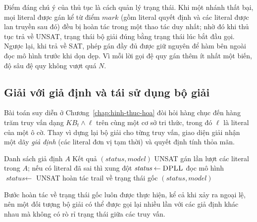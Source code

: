 Điểm đáng chú ý của thủ tục là cách quản lý trạng thái. Khi một nhánh thất bại, mọi literal được gán kể từ điểm $\textit{mark}$ (gồm literal quyết định và các literal được lan truyền sau đó) đều bị hoàn tác trong một thao tác duy nhất; nhờ đó khi thủ tục trả về UNSAT, trạng thái bộ giải đúng bằng trạng thái lúc bắt đầu gọi. Ngược lại, khi trả về SAT, phép gán đầy đủ được giữ nguyên để hàm bên ngoài đọc mô hình trước khi dọn dẹp. Vì mỗi lời gọi đệ quy gán thêm ít nhất một biến, độ sâu đệ quy không vượt quá $N$.

\subsection{Giải với giả định và tái sử dụng bộ giải}
\label{subsec:dpll-gia-dinh}

Bài toán suy diễn ở Chương~\ref{chap:hinh-thuc-hoa} đòi hỏi hàng chục đến hàng trăm truy vấn dạng $KB_t \land \ell$ trên cùng một cơ sở tri thức, trong đó $\ell$ là literal của một ô cờ. Thay vì dựng lại bộ giải cho từng truy vấn, giao diện giải nhận một dãy \emph{giả định} (các literal đơn vị tạm thời) và quyết định tính thỏa mãn.

\begin{algorithm}[H]
\caption{Giải với giả định \textsc{Solve}}
\label{alg:solve}
\begin{algorithmic}[1]
\REQUIRE Danh sách giả định $A$
\ENSURE Kết quả $(\textit{status}, \textit{model})$
    \RETURN UNSAT
\ENDIF
\STATE gán lần lượt các literal trong $A$; nếu có literal đã sai thì xung đột
    \STATE $\textit{status} \leftarrow \textsc{DPLL}$
        \STATE đọc mô hình
    \ENDIF
\ELSE
    \STATE $\textit{status} \leftarrow$ UNSAT
\ENDIF
\STATE hoàn tác trail về trạng thái gốc 
\RETURN $(\textit{status}, \textit{model})$
\end{algorithmic}
\end{algorithm}

Bước hoàn tác về trạng thái gốc luôn được thực hiện, kể cả khi xảy ra ngoại lệ, nên một đối tượng bộ giải có thể được gọi lại nhiều lần với các giả định khác nhau mà không có rò rỉ trạng thái giữa các truy vấn.


